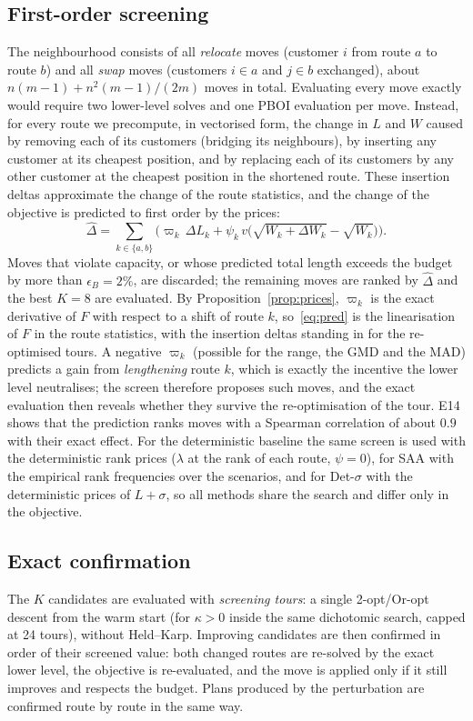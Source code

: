 \documentclass[11pt]{article}
\theoremstyle{definition}
\begin{document}
\subsection{First-order screening}\label{sec:alg:screen}
The neighbourhood consists of all \emph{relocate} moves (customer $i$ from
route $a$ to route $b$) and all \emph{swap} moves (customers $i\in a$ and
$j\in b$ exchanged), about $n(m-1)+n^2(m-1)/(2m)$ moves in total. Evaluating
every move exactly would require two lower-level solves and one PBOI
evaluation per move. Instead, for every route we precompute, in vectorised
form, the change in $L$ and $W$ caused by removing each of its customers
(bridging its neighbours), by inserting any customer at its cheapest position,
and by replacing each of its customers by any other customer at the cheapest
position in the shortened route. These insertion deltas approximate the
change of the route statistics, and the change of the objective is predicted
to first order by the prices:
\begin{equation}\label{eq:pred}
\hat\Delta=\sum_{k\in\{a,b\}}\Big(\varpi_k\,\Delta L_k+\psi_k\,v\big(\sqrt{W_k+\Delta W_k}-\sqrt{W_k}\big)\Big).
\end{equation}
Moves that violate capacity, or whose predicted total length exceeds the
budget by more than $\epsilon_B=2\%$, are discarded; the remaining moves are
ranked by $\hat\Delta$ and the best $K=8$ are evaluated. By
Proposition~\ref{prop:prices}, $\varpi_k$ is the exact derivative of $F$
with respect to a shift of route $k$, so~\eqref{eq:pred} is the
linearisation of $F$ in the route statistics, with the insertion deltas
standing in for the re-optimised tours. A negative $\varpi_k$ (possible for the
range, the GMD and the MAD) predicts a gain from \emph{lengthening} route $k$,
which is exactly the incentive the lower level neutralises; the screen
therefore proposes such moves, and the exact evaluation then reveals whether
they survive the re-optimisation of the tour. E14 shows that the prediction
ranks moves with a Spearman correlation of about $0.9$ with their exact
effect. For the deterministic baseline the same screen is used with the
deterministic rank prices ($\lambda$ at the rank of each route, $\psi=0$),
for SAA with the empirical rank frequencies over the scenarios, and for
Det-$\sigma$ with the deterministic prices of $L+\sigma$, so all methods share
the search and differ only in the objective.

\subsection{Exact confirmation}\label{sec:alg:confirm}
The $K$ candidates are evaluated with \emph{screening tours}: a single
2-opt/Or-opt descent from the warm start (for $\kappa>0$ inside the same
dichotomic search, capped at 24 tours), without Held--Karp. Improving
candidates are then confirmed in order of their screened value: both changed
routes are re-solved by the exact lower level, the objective is re-evaluated,
and the move is applied only if it still improves and respects the budget.
Plans produced by the perturbation are confirmed route by route in the same
way.
\end{document}
